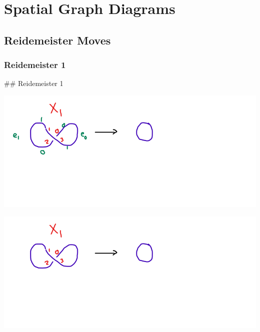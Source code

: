 \section{Spatial Graph Diagrams}

\subsection{Reidemeister Moves}

\subsubsection{Reidemeister 1}

## Reidemeister 1

\includegraphics[scale=0.5]{test_spatial_graph_diagrams/images/r1_1}


\includegraphics[scale=0.5]{test_spatial_graph_diagrams/images/r1_2}


